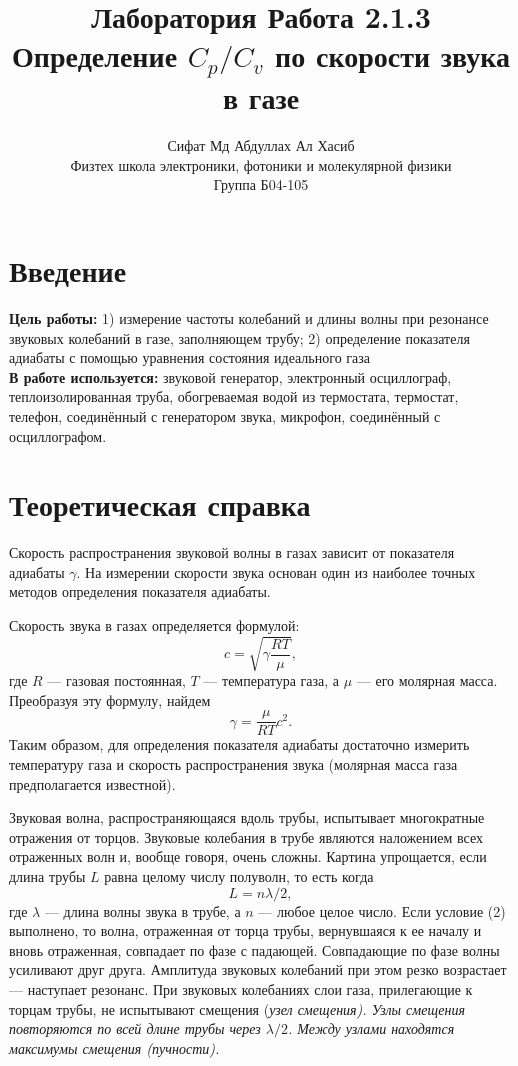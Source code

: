 \documentclass[a4paper, 12pt]{article}%
\author{Сифат Мд Абдуллах Ал Хасиб \\
Физтех школа электроники, фотоники и молекулярной физики \\
Группа Б04-105}
\title{\textbf{Лаборатория Работа 2.1.3 \\ 
Определение $C_p/C_v$ по скорости звука в газе}}
\begin{document}
\maketitle
\section{Введение}\textbf{Цель работы:} 1) измерение частоты колебаний и длины волны при резонансе звуковых колебаний в газе, заполняющем трубу;
2) определение показателя адиабаты с помощью уравнения состояния идеального газа\\
\textbf{В работе используется:} звуковой генератор, электронный осциллограф, теплоизолированная труба, обогреваемая водой из термостата, термостат, телефон, соединённый с генератором звука, микрофон, соединённый с осциллографом.
\section{Теоретическая справка}
Скорость распространения звуковой волны в газах зависит от показателя адиабаты $\gamma$. На измерении скорости звука основан один из наиболее точных методов определения показателя адиабаты.

Скорость звука в газах определяется формулой:
\[
	c = \sqrt{\gamma \frac{RT}{\mu}},
\]
где $R$ --- газовая постоянная, $T$ --- температура газа, а $\mu$ --- его молярная масса. Преобразуя эту формулу, найдем
\begin{equation}
	\gamma = \frac{\mu}{RT} c^2.
\end{equation}
Таким образом, для определения показателя адиабаты достаточно измерить температуру газа и скорость распространения звука (молярная масса газа предполагается известной).

Звуковая волна, распространяющаяся вдоль трубы, испытывает
многократные отражения от торцов. Звуковые колебания в трубе являются наложением всех отраженных волн и, вообще говоря, очень сложны. Картина упрощается, если длина трубы $L$ равна целому числу полуволн, то есть когда
\begin{equation}
	L = n \lambda/2,
\end{equation}
где $\lambda$ --- длина волны звука в трубе, а $n$ --- любое целое число. Если условие (2) выполнено, то волна, отраженная от торца трубы, вернувшаяся к ее началу и вновь отраженная, совпадает по фазе с падающей. Совпадающие по фазе волны усиливают друг друга. Амплитуда звуковых колебаний при этом резко возрастает --- наступает
резонанс.
При звуковых колебаниях слои газа, прилегающие к торцам трубы, не испытывают смещения (\itshape узел смещения\rm ). Узлы смещения повторяются по всей длине трубы через $\lambda/2$. Между узлами находятся
максимумы смещения (\itshape пучности\rm ).
\end{document}
